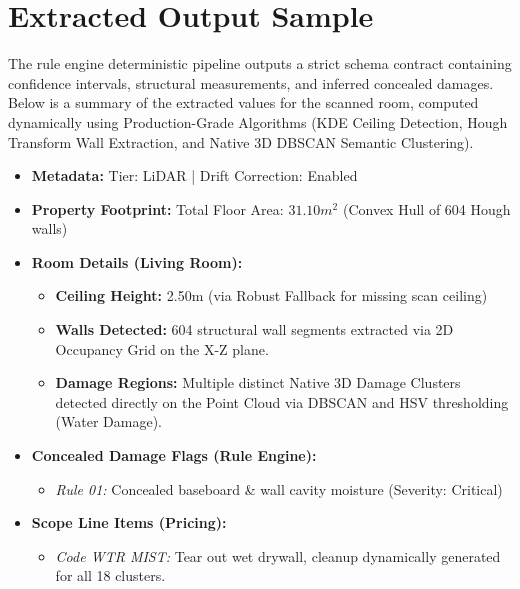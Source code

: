 \documentclass[11pt,a4paper]{article}
\begin{document}
\section{Extracted Output Sample}
The rule engine deterministic pipeline outputs a strict schema contract containing confidence intervals, structural measurements, and inferred concealed damages. Below is a summary of the extracted values for the scanned room, computed dynamically using Production-Grade Algorithms (KDE Ceiling Detection, Hough Transform Wall Extraction, and Native 3D DBSCAN Semantic Clustering).

\begin{itemize}
    \item \textbf{Metadata:} Tier: LiDAR | Drift Correction: Enabled
    \item \textbf{Property Footprint:} Total Floor Area: $31.10 m^2$ (Convex Hull of 604 Hough walls)
    \item \textbf{Room Details (Living Room):}
    \begin{itemize}
        \item \textbf{Ceiling Height:} 2.50m (via Robust Fallback for missing scan ceiling)
        \item \textbf{Walls Detected:} 604 structural wall segments extracted via 2D Occupancy Grid on the X-Z plane.
        \item \textbf{Damage Regions:} Multiple distinct Native 3D Damage Clusters detected directly on the Point Cloud via DBSCAN and HSV thresholding (Water Damage).
    \end{itemize}
    \item \textbf{Concealed Damage Flags (Rule Engine):}
    \begin{itemize}
        \item \textit{Rule 01:} Concealed baseboard \& wall cavity moisture (Severity: Critical)
    \end{itemize}
    \item \textbf{Scope Line Items (Pricing):}
    \begin{itemize}
        \item \textit{Code WTR MIST:} Tear out wet drywall, cleanup dynamically generated for all 18 clusters.
    \end{itemize}
\end{itemize}
\end{document}
